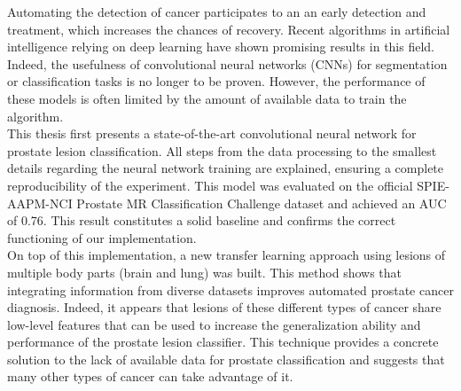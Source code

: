 
Automating the detection of cancer participates to an an early detection and treatment, which increases the chances of recovery. Recent algorithms in artificial intelligence relying on deep learning have shown promising results in this field. Indeed, the usefulness of convolutional neural networks (CNNs) for segmentation or classification tasks is no longer to be proven. However, the performance of these models is often limited by the amount of available data to train the algorithm.\\
This thesis first presents a state-of-the-art convolutional neural network for prostate lesion classification. All steps from the data processing to the smallest details regarding the neural network training are explained, ensuring a complete reproducibility of the experiment. This model was evaluated on the official SPIE-AAPM-NCI Prostate MR Classification Challenge dataset and achieved an AUC of 0.76. This result constitutes a solid baseline and confirms the correct functioning of our implementation.\\
On top of this implementation, a new transfer learning approach using lesions of multiple body parts (brain and lung) was built. This method shows that integrating information from diverse datasets improves automated prostate cancer diagnosis. Indeed, it appears that lesions of these different types of cancer share low-level features that can be used to increase the generalization ability and performance of the prostate lesion classifier. This technique provides a concrete solution to the lack of available data for prostate classification and suggests that many other types of cancer can take advantage of it.
